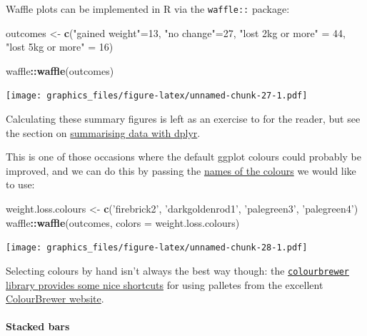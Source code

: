 \documentclass[]{article}
\newenvironment{Shaded}{\begin{snugshade}}{\end{snugshade}}
\newcommand{\KeywordTok}[1]{\textcolor[rgb]{0.13,0.29,0.53}{\textbf{#1}}}
\newcommand{\DataTypeTok}[1]{\textcolor[rgb]{0.13,0.29,0.53}{#1}}
\newcommand{\DecValTok}[1]{\textcolor[rgb]{0.00,0.00,0.81}{#1}}
\newcommand{\StringTok}[1]{\textcolor[rgb]{0.31,0.60,0.02}{#1}}
\newcommand{\OperatorTok}[1]{\textcolor[rgb]{0.81,0.36,0.00}{\textbf{#1}}}
\newcommand{\NormalTok}[1]{#1}
\let\oldparagraph\paragraph
\renewcommand{\paragraph}[1]{\oldparagraph{#1}\mbox{}}
\theoremstyle{definition}
\theoremstyle{definition}
\theoremstyle{definition}
\theoremstyle{remark}
\begin{document}
Waffle plots can be implemented in R via the \texttt{waffle::} package:

\begin{Shaded}
\begin{Highlighting}[]
\NormalTok{outcomes <-}\StringTok{ }\KeywordTok{c}\NormalTok{(}\StringTok{"gained weight"}\NormalTok{=}\DecValTok{13}\NormalTok{, }
              \StringTok{"no change"}\NormalTok{=}\DecValTok{27}\NormalTok{, }
              \StringTok{"lost 2kg or more"}\NormalTok{ =}\StringTok{ }\DecValTok{44}\NormalTok{, }
              \StringTok{"lost 5kg or more"}\NormalTok{ =}\StringTok{ }\DecValTok{16}\NormalTok{)}

\NormalTok{waffle}\OperatorTok{::}\KeywordTok{waffle}\NormalTok{(outcomes)}
\end{Highlighting}
\end{Shaded}

\texttt{[image: graphics\_files/figure-latex/unnamed-chunk-27-1.pdf]}

{Calculating these summary figures is left as an exercise to for the
reader, but see the section on
\protect\hyperlink{split-apply-combine}{summarising data with dplyr}.}

This is one of those occasions where the default ggplot colours could
probably be improved, and we can do this by passing the
\protect\hyperlink{named-colours}{names of the colours} we would like to
use:

\begin{Shaded}
\begin{Highlighting}[]
\NormalTok{weight.loss.colours <-}\StringTok{ }\KeywordTok{c}\NormalTok{(}\StringTok{'firebrick2'}\NormalTok{, }\StringTok{'darkgoldenrod1'}\NormalTok{, }\StringTok{'palegreen3'}\NormalTok{, }\StringTok{'palegreen4'}\NormalTok{)}
\NormalTok{waffle}\OperatorTok{::}\KeywordTok{waffle}\NormalTok{(outcomes, }\DataTypeTok{colors =}\NormalTok{ weight.loss.colours)}
\end{Highlighting}
\end{Shaded}

\texttt{[image: graphics\_files/figure-latex/unnamed-chunk-28-1.pdf]}

Selecting colours by hand isn't always the best way though: the
\protect\hyperlink{color-brewer}{\texttt{colourbrewer} library provides
some nice shortcuts} for using palletes from the excellent
\href{http://colorbrewer2.org}{ColourBrewer website}.

\paragraph{Stacked bars}\label{stacked-bars}
\end{document}
